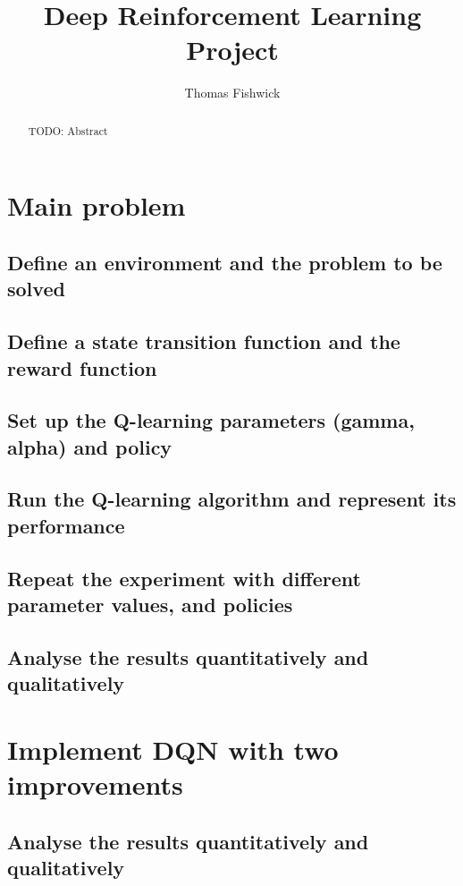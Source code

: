 \documentclass[a4pape, 11pt, english]{article} %
\begin{document}
\title{Deep Reinforcement Learning Project}
\author{Thomas Fishwick}

\maketitle

\begin{abstract}
TODO: Abstract
\end{abstract}

\section{Main problem}
\subsection{Define an environment and the problem to be solved}

\subsection{Define a state transition function and the reward function}

\subsection{Set up the Q-learning parameters (gamma, alpha) and policy}

\subsection{Run the Q-learning algorithm and represent its performance}

\subsection{Repeat the experiment with different parameter values, and policies}

\subsection{Analyse the results quantitatively and qualitatively}

\section{Implement DQN with two improvements}

\subsection{Analyse the results quantitatively and qualitatively}
\end{document}
